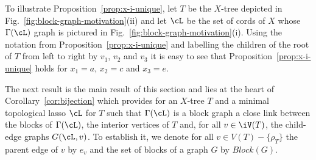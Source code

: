 To illustrate Proposition~\ref{prop:x-i-unique}, let $T$ be the $X$-tree
depicted in Fig.~\ref{fig:block-graph-motivation}(ii) and let $\cL$ be the set
of cords of $X$ whose $\Gamma(\cL)$ graph is pictured in
Fig.~\ref{fig:block-graph-motivation}(i).  Using the notation from
Proposition~\ref{prop:x-i-unique} and labelling the children of the root of
$T$ from left to right by $v_1$, $v_2$ and $v_3$ it is easy to see that
Proposition~\ref{prop:x-i-unique} holds for $x_1=a$, $x_2=c$ and $x_3=e$.

The next result is the main result of this section and lies at the heart of
Corollary~\ref{cor:bijection} which provides for an $X$-tree $T$ and a minimal
topological lasso $\cL$ for $T$ such that $\Gamma(\cL)$ is a block graph a
close link between the blocks of $\Gamma(\cL)$, the interior vertices of $T$
and, for all $v\in \iV(T)$, the child-edge graphs $G(\cL,v)$. To establish it,
we denote for all $v\in V(T)-\{\rho_T\}$ the parent edge of $v$ by $e_v$ and
the set of blocks of a graph $G$ by $Block(G)$.


